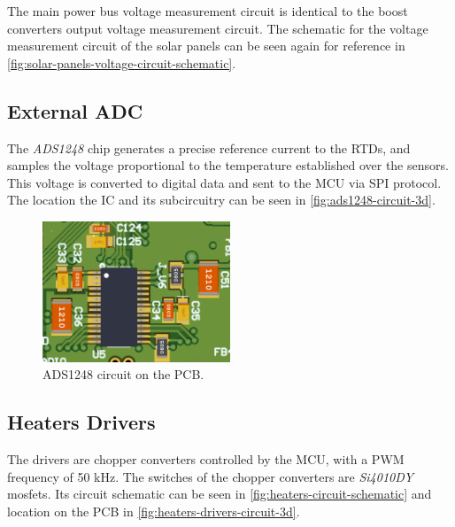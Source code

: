 The main power bus voltage measurement circuit is identical to the boost converters output voltage measurement circuit.
The schematic for the voltage measurement circuit of the solar panels can be seen again for reference in \autoref{fig:solar-panels-voltage-circuit-schematic}.

\subsection{External ADC}

The \textit{ADS1248} chip generates a precise reference current to the RTDs, and samples the voltage proportional to the temperature established over the sensors. This voltage is converted to digital data and sent to the MCU via SPI protocol.
The location the IC and its subcircuitry can be seen in \autoref{fig:ads1248-circuit-3d}.

\begin{figure}[!ht]
    \begin{center}
        \includegraphics[width=0.5\textwidth]{figures/ads1248-circuit-3d.png}
        \caption{ADS1248 circuit on the PCB.}
        \label{fig:ads1248-circuit-3d}
    \end{center}
\end{figure}

\subsection{Heaters Drivers}

The drivers are chopper converters controlled by the MCU, with a PWM frequency of 50 kHz. The switches of the chopper converters are \textit{Si4010DY} mosfets.
Its circuit schematic can be seen in \autoref{fig:heaters-circuit-schematic} and location on the PCB in \autoref{fig:heaters-drivers-circuit-3d}.

